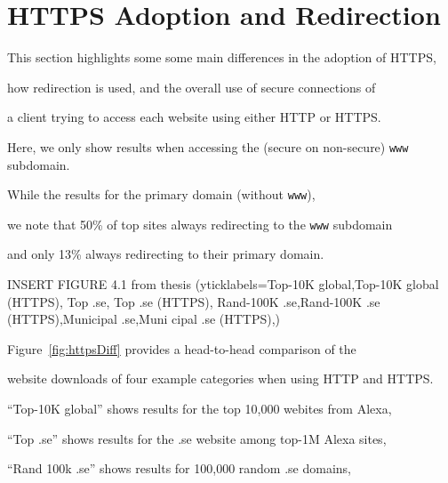 \documentclass{sig-alternate-10pt}
\begin{document}












\section{HTTPS Adoption and Redirection}\label{sec:https}



This section highlights some some main differences in the adoption of HTTPS, 

how redirection is used, and the overall use of secure connections of 

a client trying to access each website using either HTTP or HTTPS.

Here, we only show results when accessing the (secure on non-secure) \texttt{www} subdomain.

While the results for the primary domain (without \texttt{www}),

we note that 50\% of top sites always redirecting to the \texttt{www} subdomain

and only 13\% always redirecting to their primary domain.



INSERT FIGURE 4.1 from thesis (yticklabels={Top-10K global,Top-10K global (HTTPS), Top .se, Top .se (HTTPS), Rand-100K .se,Rand-100K .se (HTTPS),Municipal .se,Muni cipal .se (HTTPS)},)



Figure~\ref{fig:httpsDiff} provides a head-to-head comparison of the 

website downloads of four example categories when using HTTP and HTTPS.

``Top-10K global'' shows results for the top 10,000 webites from Alexa,

``Top .se'' shows results for the .se website among top-1M Alexa sites,

``Rand 100k .se'' shows results for 100,000 random .se domains,
\end{document}
